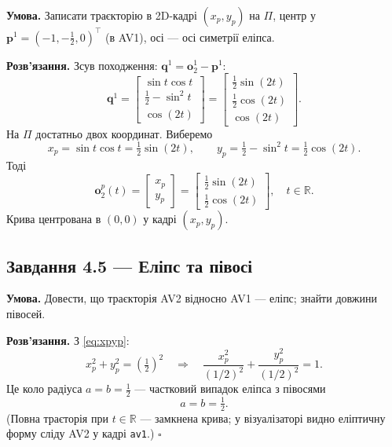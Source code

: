 \documentclass[11pt,a4paper]{article}
\newcommand{\R}{\mathbb{R}}
\begin{document}
\textbf{Умова.} Записати траєкторію в 2D-кадрі $(x_p,y_p)$ на $\Pi$, центр у $\bm{p}^1 = (-1,-\tfrac{1}{2},0)^\top$ (в AV1), осі --- осі симетрії еліпса.

\textbf{Розв'язання.}
Зсув походження: $\bm{q}^1 = \bm{o}_2^1 - \bm{p}^1$:
\begin{equation}
  \bm{q}^1 =
  \begin{bmatrix}
    \sin t\cos t \\
    \tfrac{1}{2} - \sin^2 t \\
    \cos(2t)
  \end{bmatrix}
  =
  \begin{bmatrix}
    \tfrac{1}{2}\sin(2t) \\
    \tfrac{1}{2}\cos(2t) \\
    \cos(2t)
  \end{bmatrix}.
\end{equation}
На $\Pi$ достатньо двох координат. Виберемо
\begin{equation}
  x_p = \sin t\cos t = \tfrac{1}{2}\sin(2t), \qquad
  y_p = \tfrac{1}{2} - \sin^2 t = \tfrac{1}{2}\cos(2t).
\end{equation}
Тоді
\begin{equation}
  \boxed{
  \bm{o}_2^p(t) =
  \begin{bmatrix} x_p \\ y_p \end{bmatrix}
  =
  \begin{bmatrix}
    \tfrac{1}{2}\sin(2t) \\
    \tfrac{1}{2}\cos(2t)
  \end{bmatrix},
  \quad t \in \R.
  }
\end{equation}
Крива центрована в $(0,0)$ у кадрі $(x_p,y_p)$.

\subsection{Завдання 4.5 --- Еліпс та півосі}

\textbf{Умова.} Довести, що траєкторія AV2 відносно AV1 --- еліпс; знайти довжини півосей.

\textbf{Розв'язання.}
З \eqref{eq:xpyp}:
\begin{equation}
  x_p^2 + y_p^2 = \left(\tfrac{1}{2}\right)^2
  \quad\Rightarrow\quad
  \frac{x_p^2}{(1/2)^2} + \frac{y_p^2}{(1/2)^2} = 1.
\end{equation}
Це коло радіуса $a = b = \tfrac{1}{2}$ --- частковий випадок еліпса з півосями
\begin{equation}
  \boxed{a = b = \tfrac{1}{2}.}
\end{equation}
(Повна траєторія при $t\in\R$ --- замкнена крива; у візуалізаторі видно еліптичну форму сліду AV2 у кадрі \texttt{av1}.) \hfill$\square$
\end{document}
